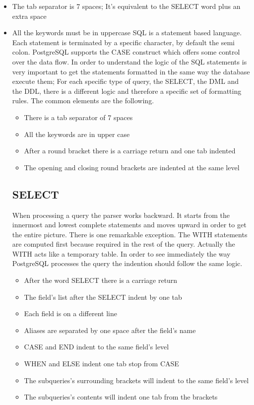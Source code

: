 \begin{itemize}
 \item The tab separator is 7 spaces; It's equivalent to the SELECT word plus an extra space
 \item All the keywords must be in uppercase
SQL is a statement based language. Each statement is terminated by a specific character, by 
default the semi colon. PostgreSQL supports the CASE construct which offers some control over the data flow. In 
order to understand the logic of the SQL statements is very important to get the statements formatted in the same 
way the database execute them; For each specific type of query, the SELECT, the DML and the DDL, there is 
a different logic and therefore a specific set of formatting rules. The common elements are the following.

\begin{itemize}
 \item There is a tab separator of 7 spaces
 \item All the keywords are in upper case
 \item After a round bracket there is a carriage return and one tab indented 
 \item The opening and closing round brackets are indented at the same level
\end{itemize}



\subsection{SELECT}
When processing a query the parser works backward. It starts from the innermost and lowest complete statements and 
moves upward in order to get the entire picture. There is one remarkable exception. The WITH statements are computed 
first because required in the rest of the query. Actually the WITH acts like a temporary table. In order to see 
immediately the way PostgreSQL processes the query the indention should follow the same logic. \newline

\begin{itemize}
 \item After the word SELECT there is a carriage return
 \item The field's list after the SELECT indent by one tab
 \item Each field is on a different line 
 \item Aliases are separated by one space after the field's name
 \item CASE and END indent to the same field's level
 \item WHEN and ELSE indent one tab stop from CASE
 \item The subqueries's surrounding brackets will indent to the same field's level
 \item The subqueries's contents will indent one tab from the brackets
 

\end{itemize}
\end{itemize}
